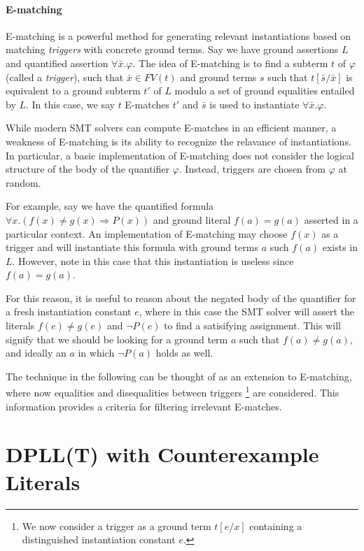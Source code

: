 \documentclass{llncs}
\begin{document}
\paragraph{E-matching}
E-matching is a powerful method for generating relevant instantiations based on matching \emph{triggers} with concrete ground terms. 
Say we have ground assertions $L$ and quantified assertion $\forall \bar{x}. \varphi$.
The idea of E-matching is to find a subterm $t$ of $\varphi$ (called a \emph{trigger}), such that $\bar{x} \in FV( t )$ and ground terms $s$ such that $t[\bar{s}/\bar{x}]$ is equivalent to a ground subterm $t'$ of $L$ modulo a set of ground equalities entailed by $L$.
In this case, we say $t$ E-matches $t'$ and $\bar{s}$ is used to instantiate $\forall \bar{x}. \varphi$.

While modern SMT solvers can compute E-matches in an efficient manner, a weakness of E-matching is its ability to recognize the relavance of instantiations.
In particular, a basic implementation of E-matching does not consider the logical structure of the body of the quantifier $\varphi$.
Instead, triggers are chosen from $\varphi$ at random.

For example, say we have the quantified formula $\forall x. ( f(x) \neq g(x) \Rightarrow P( x ) )$ and ground literal $f( a ) = g( a )$ asserted in a particular context. 
An implementation of E-matching may choose $f( x )$ as a trigger and will instantiate this formula with ground terms $a$ such $f( a )$ exists in $L$.
However, note in this case that this instantiation is useless since $f( a ) = g( a )$.

For this reason, it is useful to reason about the negated body of the quantifier for a fresh instantiation constant $e$, where in this case the SMT solver will assert the literals $f( e ) \neq g( e )$ and $\neg P( e )$ to find a satisifying assignment.
This will signify that we should be looking for a ground term $a$ such that $f( a ) \neq g( a )$, and ideally an $a$ in which $\neg P( a )$ holds as well.

The technique in the following can be thought of as an extension to E-matching, where now equalities and disequalities between triggers \footnote{We now consider a trigger as a ground term $t[e/x]$ containing a distinguished instantiation constant $e$. }
 are considered.
This information provides a criteria for filtering irrelevant E-matches.

\section{DPLL(T) with Counterexample Literals}
\label{dpll-ce-lit}
\end{document}
